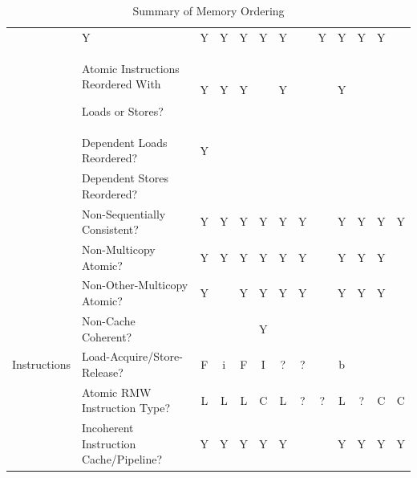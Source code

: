 \begin{table}[tbh]
\begin{tabular}{llccccccccccc}
		 & Y   & Y   & Y   & Y     & Y  & Y     & ~   & Y & Y   & Y & Y \\
	& \parbox[c][6ex]{2in}{\raggedright Atomic Instructions Reordered With\par Loads or Stores?}
		 & Y   & Y   & Y   & ~     & Y  & ~     & ~   & Y & ~   & ~ & ~ \\
	& Dependent Loads Reordered?
		 & Y   & ~   & ~   & ~     & ~  & ~     & ~   & ~ & ~   & ~ & ~ \\
	& Dependent Stores Reordered?
		 & ~   & ~   & ~   & ~     & ~  & ~     & ~   & ~ & ~   & ~ & ~ \\
	& Non-Sequentially Consistent?
		 & Y   & Y   & Y   & Y     & Y  & Y     & ~   & Y & Y   & Y & Y \\
	& Non-Multicopy Atomic?
		 & Y   & Y   & Y   & Y     & Y  & Y     & ~   & Y & Y   & Y & ~ \\
	& Non-Other-Multicopy Atomic?
		 & Y   & ~   & Y   & Y     & Y  & Y     & ~   & Y & Y   & Y & ~ \\
	& Non-Cache Coherent?
		 & ~   & ~   & ~   & Y     & ~  & ~     & ~   & ~ & ~   & ~ & ~ \\
	\cmidrule(r){1-2} 
	Instructions
	& Load-Acquire/Store-Release?
		 & F   & i   & F   & I     & ?  & ?     & ~   & b & ~   & ~ & ~ \\
	& Atomic RMW Instruction Type?
		 & L   & L   & L   & C     & L  & ?     & ?   & L & ?   & C & C \\
	& Incoherent Instruction Cache/Pipeline?
		 & Y   & Y   & Y   & Y     & Y  & ~     & ~   & Y & Y   & Y & Y \\
	\bottomrule
\end{tabular}

\vspace{5pt}\hfill
{}\OneColumnHSpace{-0.7in}
\caption{Summary of Memory Ordering}
\label{tab:memorder:Summary of Memory Ordering}
\end{table}

